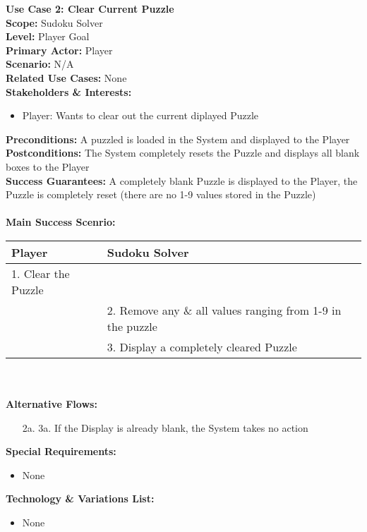 \documentclass[letterpaper]{article}
\begin{document}
\noindent
\textbf{Use Case 2:  Clear Current Puzzle}\\
\textbf{Scope:  }Sudoku Solver\\
\textbf{Level:  }Player Goal\\
\textbf{Primary Actor:  }Player\\
\textbf{Scenario:  }N/A\\
\textbf{Related Use Cases:  }None\\
\textbf{Stakeholders \& Interests:}
\begin{itemize}
\item Player:  Wants to clear out the current diplayed Puzzle
\end{itemize}
\textbf{Preconditions:  }A puzzled is loaded in the System and
displayed to the Player\\
\textbf{Postconditions:  }The System completely resets the Puzzle and
displays all blank boxes to the Player\\
\textbf{Success Guarantees:  }A completely blank Puzzle is displayed
to the Player, the Puzzle is completely reset (there are no 1-9 values
stored in the Puzzle)\\\\
\textbf{Main Success Scenrio:  }\\
\begin{tabular}{|p{5.75cm}|p{5.75cm}|}\hline
\textbf{Player} & \textbf{Sudoku Solver}\\\hline
1.  Clear the Puzzle &\\\hline
& 2.  Remove any \& all values ranging from 1-9 in the puzzle\\\hline
& 3.  Display a completely cleared Puzzle\\\hline 
\end{tabular}\\\\
\textbf{Alternative Flows:}
\begin{itemize}
\item[2a. 3a. ]If the Display is already blank, the System takes no
action
\end{itemize}
\textbf{Special Requirements:}
\begin{itemize}
\item None
\end{itemize}
\textbf{Technology \& Variations List:}
\begin{itemize}
\item None
\end{itemize}
\end{document}
